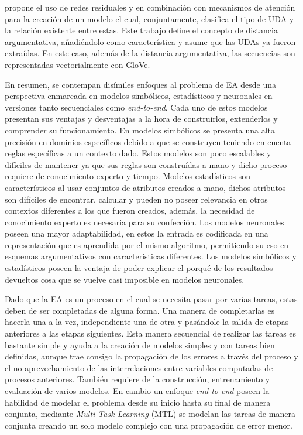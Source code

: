\textcite{galassi2021deep} propone el uso de redes residuales y en combinación con mecanismos de atención
para la creación de un modelo el cual, conjuntamente, clasifica el tipo de UDA y la relación existente entre estas.
Este trabajo define el concepto de distancia argumentativa, añadiéndolo como característica y asume que las UDAs ya fueron 
extraídas. En este caso, además de la distancia argumentativa, las secuencias son representadas 
vectorialmente con GloVe.

En resumen, se contempan disímiles enfoques al problema de EA desde una perspectiva enmarcada en modelos 
simbólicos, estadísticos y neuronales en versiones tanto secuenciales como \emph{end-to-end}. 
Cada uno de estos modelos presentan sus ventajas y desventajas a la hora de construirlos, 
extenderlos y comprender su funcionamiento. En modelos simbólicos se presenta una alta
precisión en dominios específicos debido a que se construyen teniendo en cuenta reglas específicas a un
contexto dado. Estos modelos son poco escalables y difíciles de mantener ya que sus reglas son construídas
a mano y dicho proceso requiere de conocimiento experto y tiempo. Modelos estadísticos son
característicos al usar conjuntos de atributos creados a mano, dichos atributos son difíciles
de encontrar, calcular y pueden no poseer relevancia en otros contextos diferentes a los que fueron creados,
además, la necesidad de conocimiento experto es necesaria para su confección. Los modelos neuronales poseen
una mayor adaptabilidad, en estos la entrada es codificada en una representación que es aprendida por
el mismo algoritmo, permitiendo su eso en esquemas argumentativos con características diferentes. Los modelos simbólicos y 
estadísticos poseen la ventaja de poder explicar el porqué de los resultados devueltos cosa que se vuelve casi
imposible en modelos neuronales.

Dado que la EA es un proceso en el cual se necesita pasar por varias tareas, estas deben de ser completadas
de alguna forma. Una manera de completarlas es hacerla una a la vez, independiente una de otra y pasándole
la salida de etapas anteriores a las etapas siguientes. Esta manera secuencial de realizar las 
tareas es bastante simple y ayuda a la creación de modelos simples y con tareas bien definidas, aunque trae consigo 
la propagación de los errores a través del proceso y el no aprevechamiento de las interrelaciones entre variables 
computadas de procesos anteriores. También requiere de la construcción, entrenamiento y evaluación de varios modelos.
En cambio un enfoque \emph{end-to-end} poseen la habilidad de modelar el problema 
desde su inicio hasta su final de manera conjunta, mediante \emph{Multi-Task Learning} (MTL) se modelan
las tareas de manera conjunta creando un solo modelo complejo con una propagación de error menor.

